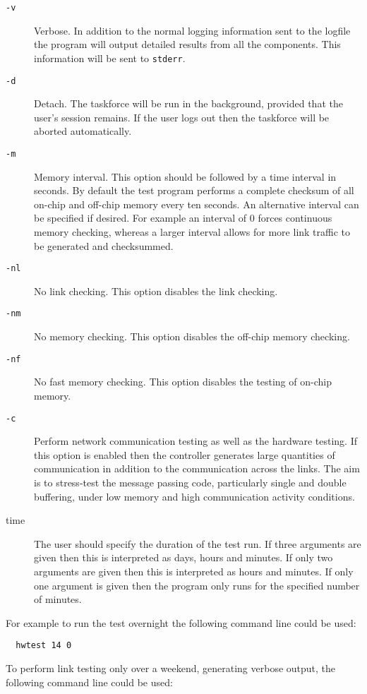 \begin{description}
\item [{\tt -v}] Verbose. In addition to the normal logging information
sent to the logfile the program will output detailed results from all
the components. This information will be sent to {\tt stderr}.
\item [{\tt -d}] Detach. The taskforce will be run in the background,
provided that the user's session remains. If the user logs out then
the taskforce will be aborted automatically.
\item [{\tt -m}] Memory interval. This option should be followed by
a time interval in seconds. By default the test program performs a
complete checksum of all on-chip and off-chip memory every ten seconds.
An alternative interval can be specified if desired. For example an
interval of 0 forces continuous memory checking, whereas a larger
interval allows for more link traffic to be generated and checksummed.
\item [{\tt -nl}] No link checking. This option disables the link
checking. 
\item [{\tt -nm}] No memory checking. This option disables the off-chip
memory checking.
\item [{\tt -nf}] No fast memory checking. This option disables the
testing of on-chip memory.
\item [{\tt -c}] Perform network communication testing as well as
the hardware testing. If this option is enabled then the controller
generates large quantities of communication in addition to the
communication across the links. The aim is to stress-test the
message passing code, particularly single and double buffering,
under low memory and high communication activity conditions.
\item [time] The user should specify the duration of the test run.
If three arguments are given then this is interpreted as days, hours
and minutes. If only two arguments are given then this is interpreted
as hours and minutes. If only one argument is given then the program
only runs for the specified number of minutes.
\end{description}

For example to run the test overnight the following command line could
be used:

\begin{verbatim}
  hwtest 14 0
\end{verbatim}

To perform link testing only over a weekend, generating verbose output,
the following command line could be used:


